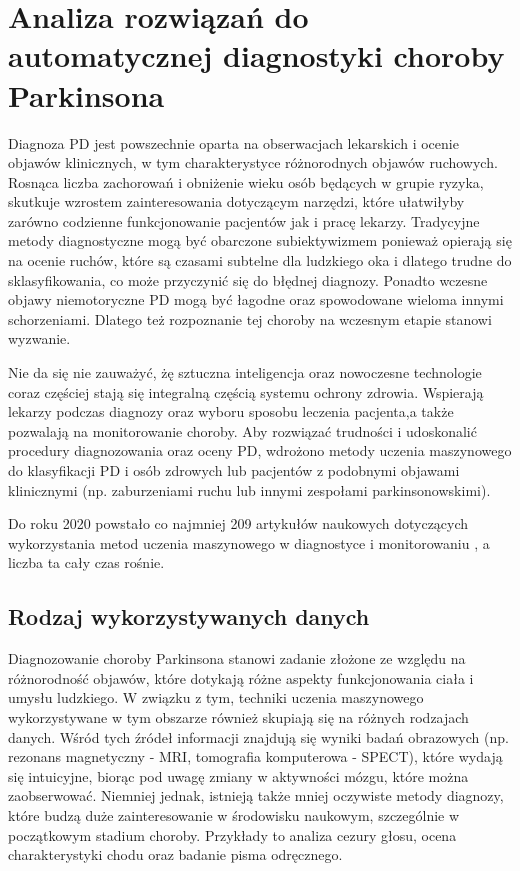 \chapter{Analiza rozwiązań do automatycznej diagnostyki choroby Parkinsona}\label{ch:analiza-rozwiazan}


Diagnoza PD jest powszechnie oparta na obserwacjach lekarskich i ocenie objawów klinicznych, w tym charakterystyce różnorodnych objawów ruchowych.
Rosnąca liczba zachorowań i obniżenie wieku osób będących w grupie ryzyka, skutkuje wzrostem zainteresowania dotyczącym narzędzi, które ułatwiłyby
zarówno codzienne funkcjonowanie pacjentów jak i pracę lekarzy.
Tradycyjne metody diagnostyczne mogą być obarczone subiektywizmem ponieważ opierają się na ocenie ruchów, które są czasami subtelne dla
ludzkiego oka i dlatego trudne do sklasyfikowania, co może przyczynić się do błędnej diagnozy.
Ponadto wczesne objawy niemotoryczne PD mogą być łagodne oraz spowodowane wieloma innymi schorzeniami.
Dlatego też rozpoznanie tej choroby na wczesnym etapie stanowi wyzwanie.

Nie da się nie zauważyć, żę sztuczna inteligencja oraz nowoczesne technologie coraz częściej stają się integralną częścią systemu ochrony zdrowia.
Wspierają lekarzy podczas diagnozy oraz wyboru sposobu leczenia pacjenta,a także pozwalają na monitorowanie choroby.
Aby rozwiązać trudności i udoskonalić procedury diagnozowania oraz oceny PD, wdrożono metody uczenia maszynowego do klasyfikacji PD i osób zdrowych lub
pacjentów z podobnymi objawami klinicznymi (np. zaburzeniami ruchu lub innymi zespołami parkinsonowskimi).


Do roku 2020 powstało co najmniej 209 artykułów naukowych dotyczących wykorzystania metod uczenia maszynowego w diagnostyce i monitorowaniu \cite{ML_for_PD_review},
a liczba ta cały czas rośnie.


\section{Rodzaj wykorzystywanych danych}\label{sec:dane-przeglad}

Diagnozowanie choroby Parkinsona stanowi zadanie złożone ze względu na różnorodność objawów, które dotykają różne aspekty
funkcjonowania ciała i umysłu ludzkiego.
W związku z tym, techniki uczenia maszynowego wykorzystywane w tym obszarze również skupiają się na różnych rodzajach danych.
Wśród tych źródeł informacji znajdują się wyniki badań obrazowych (np. rezonans magnetyczny - MRI, tomografia komputerowa - SPECT),
które wydają się intuicyjne, biorąc pod uwagę zmiany w aktywności mózgu, które można zaobserwować.
Niemniej jednak, istnieją także mniej oczywiste metody diagnozy, które budzą duże zainteresowanie w środowisku naukowym, szczególnie w początkowym stadium choroby.
Przykłady to analiza cezury głosu, ocena charakterystyki chodu oraz badanie pisma odręcznego.

